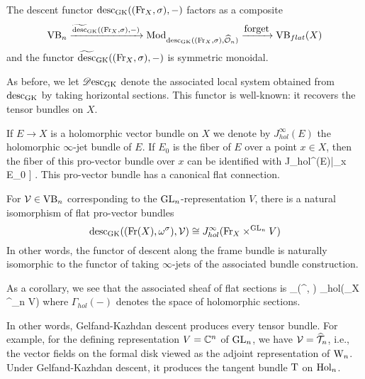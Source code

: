 \documentclass[10pt]{amsart}
\begin{document}
\begin{lem}
The descent functor ${\rm desc}_{\rm GK}(({\rm Fr}_X,\sigma),-)$ factors as a composite
\[
\VB_n \xto{\widetilde{\desc}_\GK((\Fr_X,\sigma),-)} \Mod_{\desc_\GK((\Fr_X,\sigma),\hO_n)} \xto{\txt{forget}} \VB_{flat}(X)
\]
and the functor $\widetilde{{\rm desc}}_{\rm GK}(({\rm Fr}_X,\sigma),-)$ is symmetric monoidal.
\end{lem}

As before, we let $\mathscr{D}{\rm esc}_{{\rm GK}}$ denote the associated local system
obtained from ${\rm desc}_{{\rm GK}}$ by taking horizontal sections. This
functor is well-known: it recovers the tensor bundles on $X$.

If $E \to X$ is a holomorphic vector bundle on $X$ we denote by
$J_{hol}^\infty(E)$ the holomorphic $\infty$-jet bundle of $E$. If
$E_0$ is the fiber of $E$ over a point $x \in X$, then the fiber of
this pro-vector bundle over $x$ can be identified with
\ben
J_{hol}^\infty (E)|_{x} \cong E_0 \times \CC [[ t_1,\ldots,t_n]] .
\een
This pro-vector bundle has a canonical flat connection.

\begin{prop}
For $\mathcal{V} \in {\rm VB}_n$ corresponding to the ${\rm GL}_n$-representation $V$,
there is a natural isomorphism of flat pro-vector bundles
\[
{\rm desc}_{\rm GK}(({\rm Fr}(X),\omega^\sigma),\mathcal{V}) \cong J_{hol}^\infty({\rm Fr}_X
\times^{{\rm GL}_n} V)
\]
In other words, the functor of descent along the frame bundle is
naturally isomorphic to the functor of taking $\infty$-jets of the associated bundle construction.
\end{prop} 

As a corollary, we see that the associated sheaf of flat sections is
\ben
\sdesc_{\GK}(\omega^\sigma, \cV) \cong \Gamma_{hol}(\Fr_X
\times^{\GL_n} V)
\een
where $\Gamma_{hol}(-)$ denotes the space of holomorphic sections. 

In other words, Gelfand-Kazhdan descent produces every tensor bundle. 
For example, for the defining representation $V = \mathbb C^n$ of ${\rm GL}_n$, we have $\mathcal{V} =\widehat{\mathcal T}_n$, 
i.e., the vector fields on the formal disk viewed as the adjoint representation of  ${{\rm W}_n}$. 
Under Gelfand-Kazhdan descent, it produces the tangent bundle ${\rm T}$ on ${\rm Hol}_n$.

\end{document}
